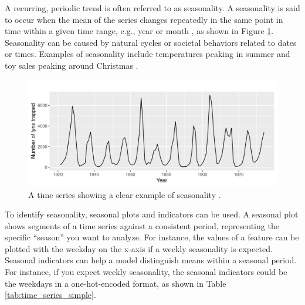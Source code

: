A recurring, periodic trend is often referred to as seasonality. A seasonality
is said to occur when the mean of the series changes repeatedly in the same
point in time within a given time range, e.g., year or month \parencite{haben2023time},
as shown in Figure \ref{fig:ts_seasonality}.
Seasonality can be caused by natural cycles or societal behaviors
related to dates or times. Examples of seasonality include temperatures peaking
in summer and toy sales peaking around Christmas  \parencite{haben2023time}.

\begin{figure}[h]
    \centering
    \includegraphics[width=0.75\linewidth]{img/Seasonality Time Series.png}
    \caption{A time series showing a clear example of seasonality \parencite{hyndman2011cyclic}.}
    \label{fig:ts_seasonality}
\end{figure}

To identify seasonality, seasonal plots and indicators can be used. A seasonal plot
shows segments of a time series against a consistent period,
representing the specific ``season'' you want to analyze. For instance, the values of a
feature can be plotted with the weekday on the x-axis if a weekly seasonality is
expected. Seasonal indicators can help a model distinguish means within a seasonal
period. For instance, if you expect weekly seasonality, the seasonal indicators
could be the weekdays in a one-hot-encoded format, as shown in Table \ref{tab:time_series_simple}.

